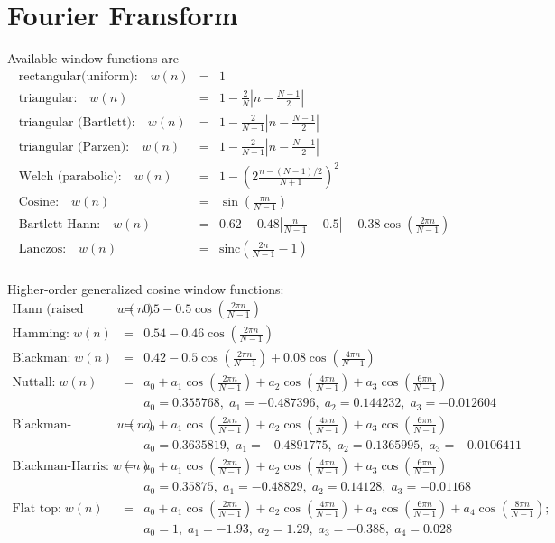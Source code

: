 \newpage
\section{Fourier Fransform}
Available window functions are
\begin{eqnarray*}
\text{rectangular(uniform):} \quad  w(n) &=& 1 \\
\text{triangular:} \quad w(n) &=& 1 - \frac{2}{N} \left| n-\frac{N-1}{2} \right| \\
\text{triangular (Bartlett):} \quad  w(n) &=&  1 - \frac{2}{N-1} \left|n-\frac{N-1}{2}\right| \\
\text{triangular (Parzen):} \quad  w(n) &=& 1 - \frac{2}{N+1} \left| n-\frac{N-1}{2} \right| \\
\text{Welch (parabolic):} \quad  w(n) &=& 1 - \left(2 \frac{n-(N-1)/2}{N+1} \right)^2 \\
\text{Cosine:} \quad  w(n) &=& \sin\left( \frac{\pi n}{N-1} \right) \\
\text{Bartlett-Hann:} \quad  w(n) &=& 0.62 - 0.48 \left| \frac{n}{N-1}-0.5 \right| - 0.38 \cos\left(\frac{2\pi n}{N-1}\right) \\
\text{Lanczos:} \quad  w(n) &=& \mathrm{sinc} \left(\frac{2n}{N-1}-1\right) \\
\end{eqnarray*}

Higher-order generalized cosine window functions:
\begin{eqnarray*}
\text{Hann (raised cosine):} \;  w(n) &=& 0.5 - 0.5 \cos \left(\frac{2 \pi n}{N-1}\right) \\
%
\text{Hamming:} \;  w(n) &=& 0.54 - 0.46 \cos\left( \frac{2\pi n}{N-1} \right) \\
%
\text{Blackman:} \;  w(n) &=& 0.42 - 0.5 \cos\left(\frac{2\pi n}{N-1}\right) + 0.08 \cos\left(\frac{4\pi n}{N-1} \right) \\
%
\text{Nuttall:} \;  w(n) &=& a_0 + a_1 \cos\left(\frac{2\pi n}{N-1}\right) + a_2 \cos\left(\frac{4\pi n}{N-1}\right) + a_3 \cos\left(\frac{6\pi n}{N-1}\right) \\
&& a_0 = 0.355768,\; a_1 =  -0.487396,\; a_2 = 0.144232,\; a_3 = -0.012604 \\
%
\text{Blackman-Nuttall:} \;  w(n) &=& a_0 + a_1 \cos\left(\frac{2\pi n}{N-1}\right) + a_2 \cos\left(\frac{4\pi n}{N-1}\right) + a_3 \cos\left(\frac{6\pi n}{N-1}\right) \\
&& a_0 = 0.3635819,\; a_1 =  -0.4891775,\; a_2 = 0.1365995,\; a_3 = -0.0106411 \\
%
\text{Blackman-Harris:} \;  w(n) &=& a_0 + a_1 \cos\left(\frac{2\pi n}{N-1}\right) + a_2 \cos\left(\frac{4\pi n}{N-1}\right) + a_3 \cos\left(\frac{6\pi n}{N-1}\right) \\
&& a_0 = 0.35875,\; a_1 =  -0.48829,\; a_2 = 0.14128,\; a_3 = -0.01168 \\
%
\text{Flat top:} \;  w(n) &=& a_0 + a_1 \cos\left(\frac{2\pi n}{N-1}\right) + a_2 \cos\left(\frac{4\pi n}{N-1}\right) +a_3 \cos\left(\frac{6\pi n}{N-1}\right) + a_4 \cos\left(\frac{8\pi n}{N-1}\right); \\
&& a_0 = 1, \; a_1 =  -1.93,\; a_2 = 1.29,\; a_3 = -0.388,\; a_4 = 0.028 \\
\end{eqnarray*}


